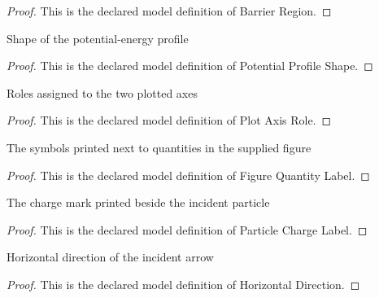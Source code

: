 \begin{proof}
  This is the declared model definition of Barrier Region.
\end{proof}
\begin{definition}
  \label{def:physics:phyx-mini-0533:phyxminiproblems-problemphyxmini0533-potentialprofileshape}
  Shape of the potential-energy profile
\end{definition}
\begin{proof}
  This is the declared model definition of Potential Profile Shape.
\end{proof}
\begin{definition}
  \label{def:physics:phyx-mini-0533:phyxminiproblems-problemphyxmini0533-plotaxisrole}
  Roles assigned to the two plotted axes
\end{definition}
\begin{proof}
  This is the declared model definition of Plot Axis Role.
\end{proof}
\begin{definition}
  \label{def:physics:phyx-mini-0533:phyxminiproblems-problemphyxmini0533-figurequantitylabel}
  The symbols printed next to quantities in the supplied figure
\end{definition}
\begin{proof}
  This is the declared model definition of Figure Quantity Label.
\end{proof}
\begin{definition}
  \label{def:physics:phyx-mini-0533:phyxminiproblems-problemphyxmini0533-particlechargelabel}
  The charge mark printed beside the incident particle
\end{definition}
\begin{proof}
  This is the declared model definition of Particle Charge Label.
\end{proof}
\begin{definition}
  \label{def:physics:phyx-mini-0533:phyxminiproblems-problemphyxmini0533-horizontaldirection}
  Horizontal direction of the incident arrow
\end{definition}
\begin{proof}
  This is the declared model definition of Horizontal Direction.
\end{proof}
